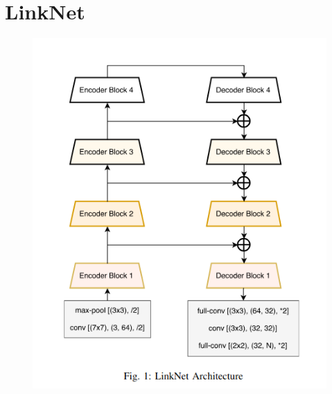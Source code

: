 \documentclass[11pt]{beamer}
\begin{document}
\section{LinkNet}
\begin{figure}
  \begin{center}
    \includegraphics[scale=1.1]{images/linknet.png}

\end{center}
\end{figure}
\end{document}
